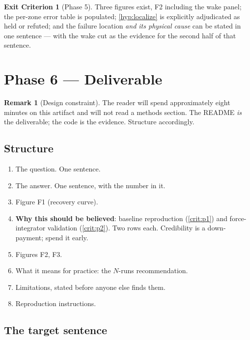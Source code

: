 \documentclass[10pt,a4paper]{article}
\theoremstyle{definition}
\newtheorem{criterion}{Exit Criterion}[section]
\newtheorem{remark}{Remark}[section]
\begin{document}
\begin{criterion}[Phase 5]
\label{crit:p5}
Three figures exist, F2 including the wake panel; the per-zone error table is
populated; \cref{hyp:localize} is explicitly adjudicated as held or refuted; and the
failure location \emph{and its physical cause} can be stated in one sentence ---
with the wake cut as the evidence for the second half of that sentence.
\end{criterion}

\section{Phase 6 --- Deliverable}

\begin{remark}[Design constraint]
The reader will spend approximately eight minutes on this artifact and will not read
a methods section. The README \emph{is} the deliverable; the code is the evidence.
Structure accordingly.
\end{remark}

\subsection{Structure}

\begin{enumerate}[label=\arabic*.]
  \item The question. One sentence.
  \item The answer. One sentence, with the number in it.
  \item Figure F1 (recovery curve).
  \item \textbf{Why this should be believed}: baseline reproduction
  (\cref{crit:p1}) and force-integrator validation (\cref{crit:p2}). Two rows each.
  Credibility is a down-payment; spend it early.
  \item Figures F2, F3.
  \item What it means for practice: the $N$-runs recommendation.
  \item Limitations, stated before anyone else finds them.
  \item Reproduction instructions.
\end{enumerate}

\subsection{The target sentence}
\end{document}
